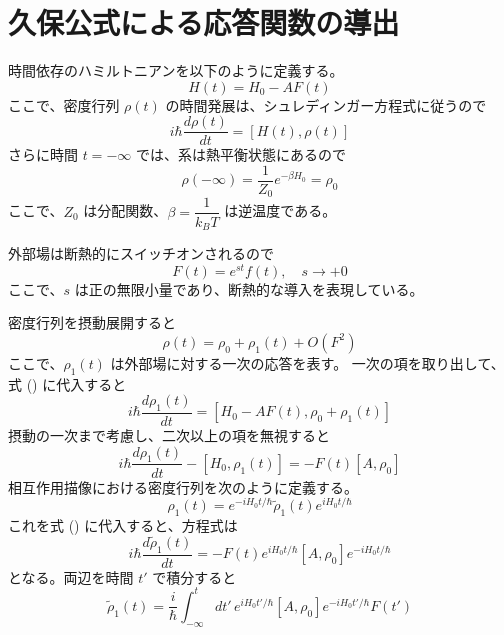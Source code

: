 \documentclass[11pt,a4j]{jreport}
\begin{document}
\section{久保公式による応答関数の導出}
時間依存のハミルトニアンを以下のように定義する。
\begin{equation}
  H(t) = H_0 - A F(t)
\end{equation}
ここで、密度行列 $\rho(t)$ の時間発展は、シュレディンガー方程式に従うので
\begin{equation}
  i\hbar \frac{d \rho(t)}{dt} = [H(t), \rho(t)] 
\end{equation}
さらに時間 $t = -\infty$ では、系は熱平衡状態にあるので
\begin{equation}
  \rho(-\infty) = \frac{1}{Z_0} e^{-\beta H_0} = \rho_0 
\end{equation}
ここで、$ Z_0 $ は分配関数、$ \beta = \dfrac{1}{k_B T} $ は逆温度である。\par
外部場は断熱的にスイッチオンされるので
\begin{equation}
  F(t) = e^{s t} f(t), \quad s \rightarrow +0 
\end{equation}
ここで、$ s $ は正の無限小量であり、断熱的な導入を表現している。\par
密度行列を摂動展開すると
\begin{equation}
  \rho(t) = \rho_0 + \rho_1(t) + O(F^2) 
\end{equation}
ここで、$ \rho_1(t)$ は外部場に対する一次の応答を表す。
一次の項を取り出して、式 () に代入すると  
\begin{equation}
  i\hbar \frac{d \rho_1(t)}{dt} = [H_0 - A F(t), \rho_0 + \rho_1(t)]
\end{equation}
摂動の一次まで考慮し、二次以上の項を無視すると  
\begin{equation}
  i\hbar \frac{d \rho_1(t)}{dt} - [H_0, \rho_1(t)] = - F(t) [A, \rho_0] 
\end{equation}
 相互作用描像における密度行列を次のように定義する。
\begin{equation}
  \rho_1(t) = e^{-i H_0 t / \hbar} \tilde{\rho}_1(t) e^{i H_0 t / \hbar}
\end{equation}
これを式 () に代入すると、方程式は
\begin{equation}
  i\hbar \frac{d \tilde{\rho}_1(t)}{dt} = - F(t) e^{i H_0 t / \hbar} [A, \rho_0] e^{-i H_0 t / \hbar} \label{eq:3.8}
\end{equation}
となる。両辺を時間 $ t' $ で積分すると
\begin{equation}
  \tilde{\rho}_1(t) = \frac{i}{\hbar} \int_{-\infty}^{t} dt' \, e^{i H_0 t' / \hbar} [A, \rho_0] e^{-i H_0 t' / \hbar} F(t') \label{eq:3.9}
\end{equation}
\end{document}
